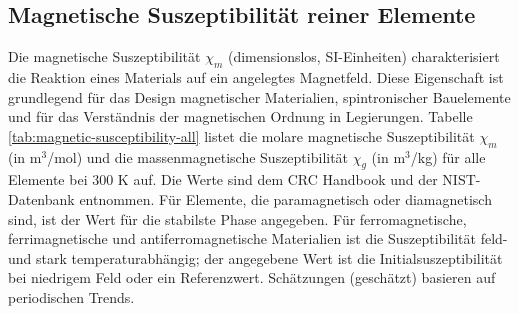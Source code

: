 \documentclass[12pt,a4paper]{article}
\begin{document}
	\subsection{Magnetische Suszeptibilität reiner Elemente}
	\label{subsec:magnetic-susceptibility}
	
	Die magnetische Suszeptibilität \(\chi_m\) (dimensionslos, SI-Einheiten) charakterisiert die Reaktion eines Materials auf ein angelegtes Magnetfeld. Diese Eigenschaft ist grundlegend für das Design magnetischer Materialien, spintronischer Bauelemente und für das Verständnis der magnetischen Ordnung in Legierungen. Tabelle \ref{tab:magnetic-susceptibility-all} listet die molare magnetische Suszeptibilität \(\chi_m\) (in m\(^3\)/mol) und die massenmagnetische Suszeptibilität \(\chi_g\) (in m\(^3\)/kg) für alle Elemente bei 300 K auf. Die Werte sind dem CRC Handbook \cite{CRC} und der NIST-Datenbank \cite{NIST} entnommen. Für Elemente, die paramagnetisch oder diamagnetisch sind, ist der Wert für die stabilste Phase angegeben. Für ferromagnetische, ferrimagnetische und antiferromagnetische Materialien ist die Suszeptibilität feld- und stark temperaturabhängig; der angegebene Wert ist die Initialsuszeptibilität bei niedrigem Feld oder ein Referenzwert. Schätzungen (geschätzt) basieren auf periodischen Trends.
	
\end{document}
